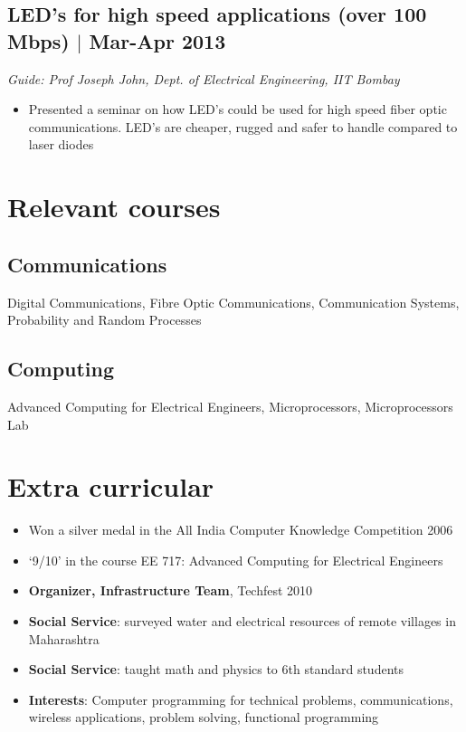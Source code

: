 \documentclass[12pt]{article}
\begin{document}
\subsection*{LED's for high speed applications (over 100 Mbps) $\vert$  Mar-Apr 2013}
\emph{Guide: Prof Joseph John, Dept. of Electrical Engineering, IIT Bombay}  
\begin{itemize}  
\item Presented a seminar on how LED's could be used for high speed fiber optic communications. LED's are cheaper, rugged and safer to handle compared to laser diodes 
\end{itemize}

\section*{Relevant courses}

\subsection*{Communications}
Digital Communications, Fibre Optic Communications, Communication Systems, Probability and Random Processes

\subsection*{Computing}
Advanced Computing for Electrical Engineers, Microprocessors, Microprocessors Lab

\section*{Extra curricular}
\begin{itemize}
\item Won a silver medal in the All India Computer Knowledge Competition 2006 
\item `9/10' in the course EE 717: Advanced Computing for Electrical Engineers 
\item \textbf{Organizer, Infrastructure Team}, Techfest 2010 
\item \textbf{Social Service}: surveyed water and electrical resources of remote villages in Maharashtra 
\item \textbf{Social Service}: taught math and physics to 6th standard students 
\item \textbf{Interests}:  Computer programming for technical problems, communications, wireless applications, problem solving, functional programming 
\end{itemize}
\end{document}
